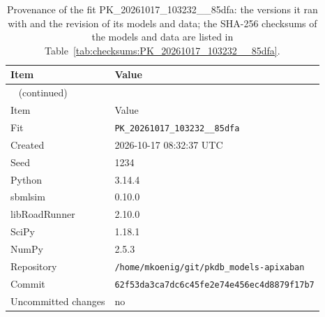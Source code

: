 \documentclass{article}
\begin{document}
\begin{longtable}{ll}
\caption{Provenance of the fit PK\_20261017\_103232\_\_85dfa: the versions it ran with and the revision of its models and data; the SHA-256 checksums of the models and data are listed in Table~\ref{tab:checksums:PK_20261017_103232__85dfa}.}\label{tab:provenance:PK_20261017_103232__85dfa} \\
\toprule
Item & Value \\
\midrule
\endfirsthead
\multicolumn{2}{l}{\small\tablename~\thetable{} (continued)} \\
\toprule
Item & Value \\
\midrule
\endhead
\bottomrule
\endlastfoot
Fit & \texttt{PK\_20261017\_103232\_\_85dfa} \\
Created & 2026-10-17 08:32:37 UTC \\
Seed & 1234 \\
Python & 3.14.4 \\
sbmlsim & 0.10.0 \\
libRoadRunner & 2.10.0 \\
SciPy & 1.18.1 \\
NumPy & 2.5.3 \\
Repository & \texttt{/home/mkoenig/git/pkdb\_models-apixaban} \\
Commit & \texttt{62f53da3ca7dc6c45fe2e74e456ec4d8879f17b7} \\
Uncommitted changes & no \\
\end{longtable}



\end{document}
